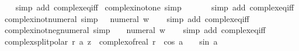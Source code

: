 \begin{isabellebody}
%
\isadelimproof
\ \ %
\endisadelimproof
%
\isatagproof
{}\isamarkupfalse%
\ {\isacharparenleft}{\kern0pt}simp\ add{\isacharcolon}{\kern0pt}\ complex{\isacharunderscore}{\kern0pt}eq{\isacharunderscore}{\kern0pt}iff{\isacharparenright}{\kern0pt}%
\endisatagproof
{\isafoldproof}%
%
\isadelimproof
\isanewline
%
\endisadelimproof
\isanewline
{}\isamarkupfalse%
\ complex{\isacharunderscore}{\kern0pt}i{\isacharunderscore}{\kern0pt}not{\isacharunderscore}{\kern0pt}one\ {\isacharbrackleft}{\kern0pt}simp{\isacharbrackright}{\kern0pt}{\isacharcolon}{\kern0pt}\ {\isachardoublequoteopen}{\isasymi}\ {\isasymnoteq}\ {}{\isachardoublequoteclose}\isanewline
%
\isadelimproof
\ \ %
\endisadelimproof
%
\isatagproof
{}\isamarkupfalse%
\ {\isacharparenleft}{\kern0pt}simp\ add{\isacharcolon}{\kern0pt}\ complex{\isacharunderscore}{\kern0pt}eq{\isacharunderscore}{\kern0pt}iff{\isacharparenright}{\kern0pt}%
\endisatagproof
{\isafoldproof}%
%
\isadelimproof
\isanewline
%
\endisadelimproof
\isanewline
{}\isamarkupfalse%
\ complex{\isacharunderscore}{\kern0pt}i{\isacharunderscore}{\kern0pt}not{\isacharunderscore}{\kern0pt}numeral\ {\isacharbrackleft}{\kern0pt}simp{\isacharbrackright}{\kern0pt}{\isacharcolon}{\kern0pt}\ {\isachardoublequoteopen}{\isasymi}\ {\isasymnoteq}\ numeral\ w{\isachardoublequoteclose}\isanewline
%
\isadelimproof
\ \ %
\endisadelimproof
%
\isatagproof
{}\isamarkupfalse%
\ {\isacharparenleft}{\kern0pt}simp\ add{\isacharcolon}{\kern0pt}\ complex{\isacharunderscore}{\kern0pt}eq{\isacharunderscore}{\kern0pt}iff{\isacharparenright}{\kern0pt}%
\endisatagproof
{\isafoldproof}%
%
\isadelimproof
\isanewline
%
\endisadelimproof
\isanewline
{}\isamarkupfalse%
\ complex{\isacharunderscore}{\kern0pt}i{\isacharunderscore}{\kern0pt}not{\isacharunderscore}{\kern0pt}neg{\isacharunderscore}{\kern0pt}numeral\ {\isacharbrackleft}{\kern0pt}simp{\isacharbrackright}{\kern0pt}{\isacharcolon}{\kern0pt}\ {\isachardoublequoteopen}{\isasymi}\ {\isasymnoteq}\ {\isacharminus}{\kern0pt}\ numeral\ w{\isachardoublequoteclose}\isanewline
%
\isadelimproof
\ \ %
\endisadelimproof
%
\isatagproof
{}\isamarkupfalse%
\ {\isacharparenleft}{\kern0pt}simp\ add{\isacharcolon}{\kern0pt}\ complex{\isacharunderscore}{\kern0pt}eq{\isacharunderscore}{\kern0pt}iff{\isacharparenright}{\kern0pt}%
\endisatagproof
{\isafoldproof}%
%
\isadelimproof
\isanewline
%
\endisadelimproof
\isanewline
{}\isamarkupfalse%
\ complex{\isacharunderscore}{\kern0pt}split{\isacharunderscore}{\kern0pt}polar{\isacharcolon}{\kern0pt}\ {\isachardoublequoteopen}{\isasymexists}r\ a{\isachardot}{\kern0pt}\ z\ {\isacharequal}{\kern0pt}\ complex{\isacharunderscore}{\kern0pt}of{\isacharunderscore}{\kern0pt}real\ r\ {\isacharasterisk}{\kern0pt}\ {\isacharparenleft}{\kern0pt}cos\ a\ {\isacharplus}{\kern0pt}\ {\isasymi}\ {\isacharasterisk}{\kern0pt}\ sin\ a{\isacharparenright}{\kern0pt}{\isachardoublequoteclose}\isanewline

\end{isabellebody}
